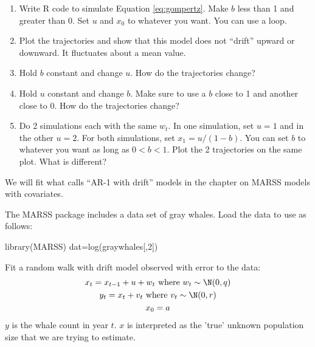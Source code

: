 \begin{hwenumerate}
\begin{enumerate}[label=\alph*)]
\item Write R code to simulate Equation \ref{eq:gompertz}.  Make $b$ less than 1 and greater than 0.  Set $u$ and $x_0$ to whatever you want.  You can use a \verb@for@ loop.  
\item Plot the trajectories and show that this model does not ``drift'' upward or downward.  It fluctuates about a mean value.
\item Hold $b$ constant and change $u$.  How do the trajectories change?
\item Hold $u$ constant and change $b$.  Make sure to use a $b$ close to 1 and another close to 0. How do the trajectories change?
\item Do 2 simulations each with the same $w_t$.  In one simulation, set $u=1$ and in the other $u=2$.  For both simulations, set $x_1 = u/(1-b)$.  You can set $b$ to whatever you want as long as $0<b<1$.  Plot the 2 trajectories on the same plot.  What is different?
\end{enumerate}

We will fit what \verb@Arima@ calls ``AR-1 with drift'' models in the chapter on MARSS models with covariates.  

\item\label{hw-uniss-4} The MARSS package includes a data set of gray whales.  Load the data to use as follows:

\begin{Schunk}
\begin{Sinput}
 library(MARSS)
 dat=log(graywhales[,2])
\end{Sinput}
\end{Schunk}

Fit a random walk with drift model observed with error to the data:
\begin{equation}
\begin{gathered}
x_t = x_{t-1}+u+w_t \text{ where } w_t \sim \N(0,q) \\
y_t = x_t+v_t \text{ where } v_t \sim \N(0,r) \\
x_0 = a 
\end{gathered}   
\label{eq:marss.rw.w.drift}\end{equation}
$y$ is the whale count in year $t$. $x$ is interpreted as the 'true' unknown population size that we are trying to estimate.


\end{hwenumerate}
